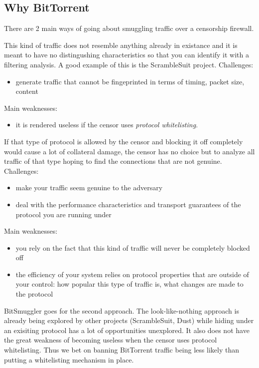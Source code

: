 \documentclass[11pt]{book} %
\newcommand{\projectName}{BitSmuggler }
\begin{document}
\subsection{Why BitTorrent}
There are 2 main ways of going about smuggling traffic over a censorship firewall.


This kind of traffic does not resemble anything already in existance and it is meant to have no distingushing characteristics so that you can identify it with a filtering analysis. A good example of this is the ScrambleSuit project.
Challenges:
\begin{itemize}
\item generate traffic that cannot be fingeprinted in terms of timing, packet size, content
\end{itemize}
Main weaknesses:
\begin{itemize}
\item it is rendered useless if the censor uses \textit{protocol whitelisting}. 
\end{itemize}



If that type of protocol is allowed by the censor and blocking it off completely would cause a lot of collateral damage, the censor has no choice but to analyze all traffic of that type hoping to find the connections that 
are not genuine.
Challenges:
\begin{itemize}
\item make your traffic seem genuine to the adversary
\item deal with the performance characteristics and transport guarantees of the protocol you are running under
\end{itemize}
Main weaknesses:
\begin{itemize}
\item you rely on the fact that this kind of traffic will never be completely blocked off
\item the efficiency of your system relies on protocol properties that are outside of your control: how popular this type of traffic is, what changes are made to the protocol 
\end{itemize}

\projectName goes for the second approach. The look-like-nothing approach is already being explored by other projects (ScrambleSuit, Dust) while hiding under an exisiting protocol has a lot of opportunities unexplored. It also does not have the great weakness of becoming useless when the censor uses protocol whitelisting. Thus we bet on banning BitTorrent traffic being less likely than putting a whitelisting mechanism in place.
\end{document}
